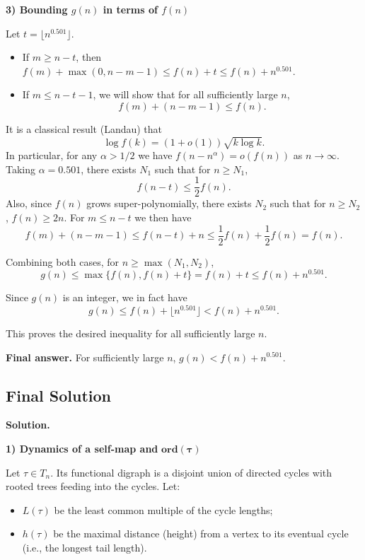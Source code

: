 \documentclass[12pt,a4paper]{article}
\theoremstyle{definition}
\begin{document}
    \textbf{3) Bounding $g(n)$ in terms of $f(n)$}

    Let $t = \lfloor n^{0.501} \rfloor$.

    \begin{itemize}
        \item If $m \geq n - t$, then $f(m) + \max(0, n - m - 1) \leq f(n) + t \leq f(n) + n^{0.501}$.

        \item If $m \leq n - t - 1$, we will show that for all sufficiently large $n$,
        $$f(m) + (n - m - 1) \leq f(n).$$
    \end{itemize}

    It is a classical result (Landau) that
    $$\log f(k) = (1 + o(1)) \sqrt{k \log k}.$$
    In particular, for any $\alpha > 1/2$ we have $f(n - n^\alpha) = o(f(n))$ as $n \to \infty$. Taking $\alpha = 0.501$, there exists $N_1$ such that for $n \geq N_1$,
    $$f(n - t) \leq \frac{1}{2} f(n).$$
    Also, since $f(n)$ grows super-polynomially, there exists $N_2$ such that for $n \geq N_2$, $f(n) \geq 2n$. For $m \leq n - t$ we then have
    $$f(m) + (n - m - 1) \leq f(n - t) + n \leq \frac{1}{2} f(n) + \frac{1}{2} f(n) = f(n).$$

    Combining both cases, for $n \geq \max(N_1, N_2)$,
    $$g(n) \leq \max\{ f(n), f(n) + t \} = f(n) + t \leq f(n) + n^{0.501}.$$

    Since $g(n)$ is an integer, we in fact have
    $$g(n) \leq f(n) + \lfloor n^{0.501} \rfloor < f(n) + n^{0.501}.$$

    This proves the desired inequality for all sufficiently large $n$.

    \textbf{Final answer.}
    For sufficiently large $n$, $g(n) < f(n) + n^{0.501}$.

    \subsection{Final Solution}
    \textbf{Solution.}

    \textbf{1) Dynamics of a self-map and} $\mathbf{\text{ord}(\tau)}$

    Let $\tau \in T_n$. Its functional digraph is a disjoint union of directed cycles with rooted trees feeding into the cycles. Let:
    \begin{itemize}
        \item $L(\tau)$ be the least common multiple of the cycle lengths;
        \item $h(\tau)$ be the maximal distance (height) from a vertex to its eventual cycle (i.e., the longest tail length).
    \end{itemize}
\end{document}
